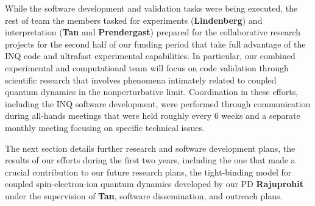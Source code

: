 While the software development and validation tasks were being executed, the rest of team the members tasked for experiments ({\bf Lindenberg}) and interpretation ({\bf Tan} and {\bf Prendergast}) prepared for the collaborative research projects for the second half of our funding period that take full advantage of the INQ code and ultrafast experimental capabilities. In particular, our combined experimental and computational team will focus on code validation through scientific research that involves phenomena intimately related to coupled quantum dynamics in the nonperturbative limit. Coordination in these efforts, including the INQ software development, were performed through communication during all-hands meetings that were held roughly every 6 weeks and a separate monthly meeting focusing on specific technical issues.
 
 The next section details further research and software development plans, the results of our efforts during the first two years, including the one that made a crucial contribution to our future research plans, the tight-binding model for coupled spin-electron-ion quantum dynamics developed by our PD {\bf Rajuprohit} under the supervision of {\bf Tan}, software dissemination, and outreach plans.
 

\clearpage
